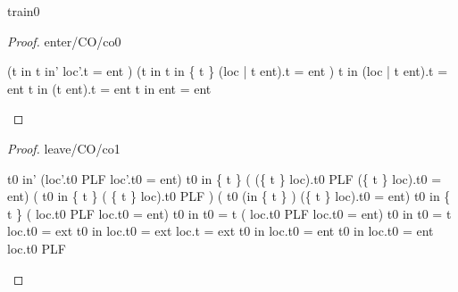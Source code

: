 \documentclass[12pt]{amsart}
\begin{document}
\begin{machine}{train0}
\begin{proof}{enter/CO/co0}
	\begin{calculation}
	\hint{=}{  }
	\hint{=}{ }
	\land	{}
	\hint{=}{ }
		(\neg t \in in \land t \in in' \implies  loc'.t = ent )
	\land	{}
		(\neg t \in in \land t \in in \bunion \{ t \} \implies  (loc | t \fun ent).t = ent )
	\hint{=}{  }
		\neg t \in in \implies  (loc | t \fun ent).t = ent 
	\hint{=}{  }
		\neg t \in in \implies  (t \fun ent).t = ent 
	\hint{=}{  }
		\neg t \in in \implies  ent = ent 
	\hint{=}{  }
		\true
	\end{calculation}
\end{proof}

\begin{proof}{leave/CO/co1}
	\begin{calculation}
		t0 \in in' \land (loc'.t0 \in PLF \lor loc'.t0 = ent)
		t0 \in in \setminus \{ t \} 
		\land ( (\{ t \} \domsub loc).t0 \in PLF \lor (\{ t \} \domsub loc).t0 = ent)
	\hint{=}{ }	%
		( t0 \in in \setminus \{ t \} 
		\land  ( \{ t \} \domsub loc).t0 \in PLF )
			   \lor ( t0 \in (in \setminus \{ t \} )
		\land (\{ t \} \domsub loc).t0 = ent)
	\hint{=}{ \ref{inv2} }	%
			t0 \in in \setminus \{ t \} 
		\land ( loc.t0 \in PLF \lor  loc.t0 = ent)
	\hint{=}{ } %
		t0 \in in \land \neg t0  = t 
		\land ( loc.t0 \in PLF \lor  loc.t0 = ent)
	\hint{=}{ \ref{asm2}, \ref{asm4}, \ref{asm3} } %
		t0 \in in \land \neg t0  = t \land \neg loc.t0 = ext
	\hint{=}{  \ref{grd0} } %
	 	t0 \in in \land \neg loc.t0 = ext \land loc.t = ext
	\hint{\follows}{  \ref{grd0}, \ref{asm2} } %
	 	t0 \in in \land loc.t0 = ent 
	\hint{=}{ \ref{asm2}  } %
	 	t0 \in in \land loc.t0 = ent  \land \neg loc.t0 \in PLF 
	\end{calculation}
\end{proof}


\end{machine}
\end{document}
